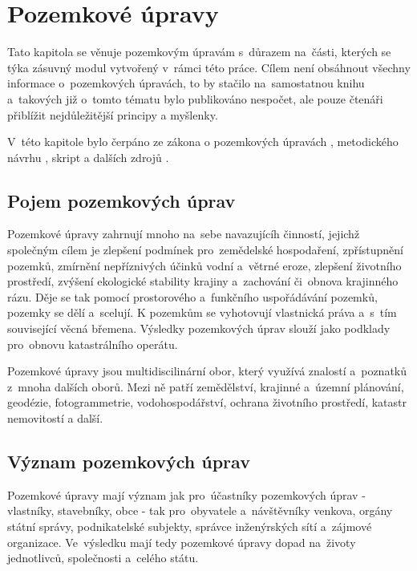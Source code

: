 \chapter{Pozemkové úpravy}
\label{2-pu}

Tato kapitola se věnuje pozemkovým úpravám s~důrazem na~části, kterých se týka zásuvný modul vytvořený v~rámci této práce. Cílem není obsáhnout všechny informace o~pozemkových úpravách, to by stačilo na~samostatnou knihu a~takových již o~tomto tématu bylo publikováno nespočet, ale pouze čtenáři přiblížit nejdůležitější principy a myšlenky.

V~této kapitole bylo čerpáno ze zákona o pozemkových úpravách \citep{pu_zakon}, metodického návrhu \citep{metodicky_navrh}, skript \citep{pu_skripta} a dalších zdrojů \citep{pu_cr}.

\section{Pojem pozemkových úprav}
\label{pojem_pu}

Pozemkové úpravy zahrnují mnoho na~sebe navazujícíh činností, jejichž společným cílem je zlepšení podmínek pro~zemědelské hospodaření, zpřístupnění pozemků, zmírnění nepříznivých účinků vodní a~větrné eroze, zlepšení životního prostředí, zvýšení ekologické stability krajiny a~zachování či~obnova krajinného rázu. Děje se tak pomocí prostorového a~funkčního uspořádávání pozemků, pozemky se dělí a~scelují. K pozemkům se vyhotovují vlastnická práva a~s~tím související věcná břemena. Výsledky pozemkových úprav slouží jako podklady pro~obnovu katastrálního operátu.

Pozemkové úpravy jsou multidiscilinární obor, který využívá znalostí a~poznatků z~mnoha dalších oborů. Mezi ně patří zemědělství, krajinné a~územní plánování, geodézie, fotogrammetrie, vodohospodářství, ochrana životního prostředí, katastr nemovitostí a další.

\section{Význam pozemkových úprav}
\label{vyznam_pu}

Pozemkové úpravy mají význam jak pro~účastníky pozemkových úprav - vlastníky, stavebníky, obce - tak pro~obyvatele a~návštěvníky venkova, orgány státní správy, podnikatelské subjekty, správce inženýrských sítí a~zájmové organizace. Ve~výsledku mají tedy pozemkové úpravy dopad na~životy jednotlivců, společnosti a~celého státu.

